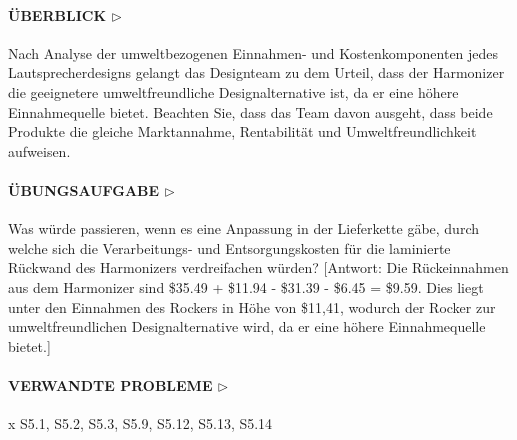 \documentclass[13pt,titlepage]{article}
\begin{document}
\paragraph{\textbf{\"UBERBLICK $\triangleright$}} Nach Analyse der umweltbezogenen Einnahmen- und Kostenkomponenten jedes Lautsprecherdesigns gelangt das Designteam zu dem Urteil, dass der Harmonizer die geeignetere umweltfreundliche Designalternative ist, da er eine höhere Einnahmequelle bietet. Beachten Sie, dass das Team davon ausgeht, dass beide Produkte die gleiche Marktannahme, Rentabilität und Umweltfreundlichkeit aufweisen.
\paragraph{\textbf{\"UBUNGSAUFGABE $\triangleright$}} Was würde passieren, wenn es eine Anpassung in der Lieferkette gäbe, durch welche sich die Verarbeitungs- und Entsorgungskosten für die laminierte Rückwand des Harmonizers verdreifachen würden? [Antwort: Die Rückeinnahmen aus dem Harmonizer sind \$35.49 + \$11.94 - \$31.39 - \$6.45 = \$9.59. Dies liegt unter den Einnahmen des Rockers in Höhe von \$11,41, wodurch der Rocker zur umweltfreundlichen Designalternative wird, da er eine höhere Einnahmequelle bietet.]

\paragraph{\textbf{VERWANDTE PROBLEME $\triangleright$}} x S5.1, S5.2, S5.3, S5.9, S5.12, S5.13, S5.14
\end{document}
